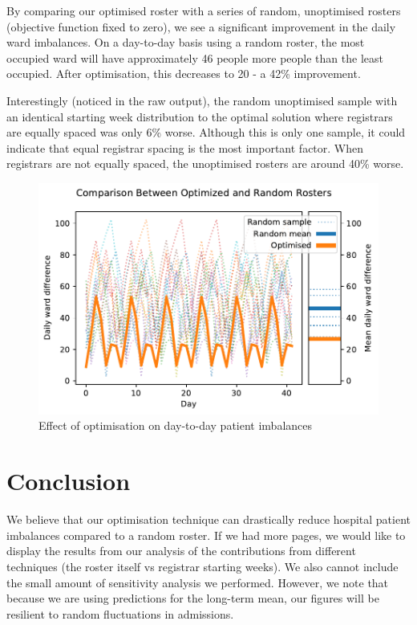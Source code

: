 \documentclass[a4paper]{article}
\begin{document}
\begin{multicols}{2}

By comparing our optimised roster with a series of random, unoptimised rosters (objective function fixed to zero), we see a significant improvement in the daily ward imbalances. On a day-to-day basis using a random roster, the most occupied ward will have approximately 46 people more people than the least occupied. After optimisation, this decreases to 20 - a 42\% improvement.

Interestingly (noticed in the raw output), the random unoptimised sample with an identical starting week distribution to the optimal solution where registrars are equally spaced was only 6\% worse. Although this is only one sample, it could indicate that equal registrar spacing is the most important factor. When registrars are not equally spaced, the unoptimised rosters are around 40\% worse.

\begin{figure}[H]
    \centering\includegraphics[width=\linewidth]{../results/comparison}
    \caption{Effect of optimisation on day-to-day patient imbalances}
    \label{fig:comparison}
\end{figure}

\end{multicols}

\section{Conclusion}

We believe that our optimisation technique can drastically reduce hospital patient imbalances compared to a random roster. If we had more pages, we would like to display the results from our analysis of the contributions from different techniques (the roster itself vs registrar starting weeks). We also cannot include the small amount of sensitivity analysis we performed. However, we note that because we are using predictions for the long-term mean, our figures will be resilient to random fluctuations in admissions.
\end{document}
